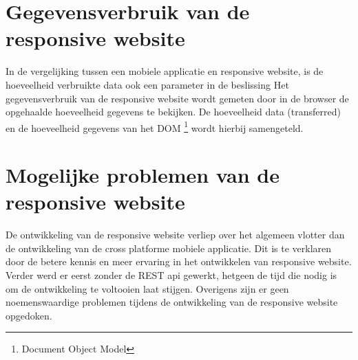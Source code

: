 \section{Gegevensverbruik van de responsive website}
In de vergelijking tussen een mobiele applicatie en responsive website, is de hoeveelheid verbruikte data ook een parameter in de beslissing
Het gegevensverbruik van de responsive website wordt gemeten door in de browser de opgehaalde hoeveelheid gegevens te bekijken.
De hoeveelheid data (transferred) en de hoeveelheid gegevens van het DOM \footnote{Document Object Model} wordt hierbij samengeteld.

\section{Mogelijke problemen van de responsive website}
De ontwikkeling van de responsive website verliep over het algemeen vlotter dan de ontwikkeling van de cross platforme mobiele applicatie.
Dit is te verklaren door de betere kennis en meer ervaring in het ontwikkelen van responsive website.
Verder werd er eerst zonder de REST api gewerkt, hetgeen de tijd die nodig is om de ontwikkeling te voltooien laat stijgen.
Overigens zijn er geen noemenswaardige problemen tijdens de ontwikkeling van de responsive website opgedoken.
